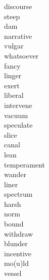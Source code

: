 \documentclass[a4paper, 11pt]{ctexart}
\begin{document}
\begin{multicols*}{3}
\begin{description}
\item[discourse]

\item[steep]

\item[dam]

\item[narrative]

\item[vulgar]

\item[whatsoever]

\item[fancy]

\item[linger]

\item[exert]

\item[liberal]

\item[intervene]

\item[vacuum]

\item[speculate]

\item[slice]

\item[canal]

\item[lean]

\item[temperament]

\item[wander]

\item[liner]

\item[spectrum]

\item[harsh]

\item[norm]

\item[bound]

\item[withdraw]

\item[blunder]

\item[incentive]

\item[mo(u)ld]

\item[vessel]


\end{description}
\end{multicols*}
\end{document}
